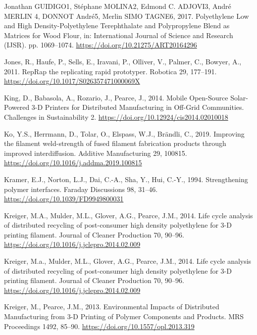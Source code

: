 \documentclass[
  12pt,
  number,
  review]{elsarticle}
\newlength{\cslhangindent}
\newlength{\cslentryspacingunit} %
\newenvironment{CSLReferences}[2] %
 {%
  \setlength{\parindent}{0pt}
  \ifodd #1
  \let\oldpar\par
  \def\par{\hangindent=\cslhangindent\oldpar}
  \fi
  \setlength{\parskip}{#2\cslentryspacingunit}
 }%
 {}
\begin{document}
\begin{CSLReferences}{1}{0}
\leavevmode{}%
Jonathan GUIDIGO1, Stéphane MOLINA2, Edmond C. ADJOVI3, André MERLIN 4,
DONNOT André5, Merlin SIMO TAGNE6, 2017. Polyethylene {Low} and {High
Density-Polyethylene Terephthalate} and {Polypropylene Blend} as
{Matrices} for {Wood Flour}, in: International {Journal} of {Science}
and {Research} ({IJSR}). pp. 1069--1074.
\url{https://doi.org/10.21275/ART20164296}

\leavevmode{}%
Jones, R., Haufe, P., Sells, E., Iravani, P., Olliver, V., Palmer, C.,
Bowyer, A., 2011. {RepRap} \textendash{} the replicating rapid
prototyper. Robotica 29, 177--191.
\url{https://doi.org/10.1017/S026357471000069X}

\leavevmode{}%
King, D., Babasola, A., Rozario, J., Pearce, J., 2014. Mobile
{Open-Source Solar-Powered} 3-{D Printers} for {Distributed
Manufacturing} in {Off-Grid Communities}. Challenges in Sustainability
2. \url{https://doi.org/10.12924/cis2014.02010018}

\leavevmode{}%
Ko, Y.S., Herrmann, D., Tolar, O., Elspass, W.J., Brändli, C., 2019.
Improving the filament weld-strength of fused filament fabrication
products through improved interdiffusion. Additive Manufacturing 29,
100815. \url{https://doi.org/10.1016/j.addma.2019.100815}

\leavevmode{}%
Kramer, E.J., Norton, L.J., Dai, C.-A., Sha, Y., Hui, C.-Y., 1994.
Strengthening polymer interfaces. Faraday Discussions 98, 31--46.
\url{https://doi.org/10.1039/FD9949800031}

\leavevmode{}%
Kreiger, M.A., Mulder, M.L., Glover, A.G., Pearce, J.M., 2014. Life
cycle analysis of distributed recycling of post-consumer high density
polyethylene for 3-{D} printing filament. Journal of Cleaner Production
70, 90--96. \url{https://doi.org/10.1016/j.jclepro.2014.02.009}

\leavevmode{}%
Kreiger, M.a., Mulder, M.L., Glover, A.G., Pearce, J.M., 2014. Life
cycle analysis of distributed recycling of post-consumer high density
polyethylene for 3-{D} printing filament. Journal of Cleaner Production
70, 90--96. \url{https://doi.org/10.1016/j.jclepro.2014.02.009}

\leavevmode{}%
Kreiger, M., Pearce, J.M., 2013. Environmental {Impacts} of {Distributed
Manufacturing} from 3-{D Printing} of {Polymer Components} and
{Products}. MRS Proceedings 1492, 85--90.
\url{https://doi.org/10.1557/opl.2013.319}


\end{CSLReferences}
\end{document}
